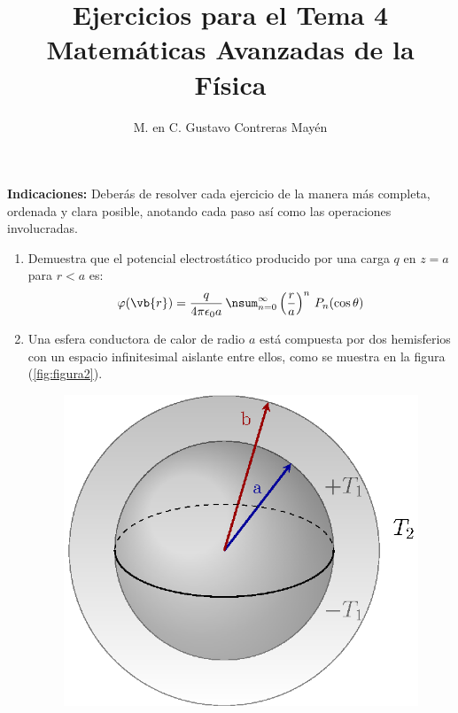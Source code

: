 
\title{Ejercicios para el Tema 4 \\[0.3em]  \large{Matemáticas Avanzadas de la Física}\vspace{-3ex}}
\author{M. en C. Gustavo Contreras Mayén}
\date{ }

\vspace{-4cm}
\maketitle
\fontsize{14}{14}\selectfont

\textbf{Indicaciones: } Deberás de resolver cada ejercicio de la manera más completa, ordenada y clara posible, anotando cada paso así como las operaciones involucradas.

\begin{enumerate}
\item Demuestra que el potencial electrostático producido por una carga $q$ en $z = a$ para $r < a$ es:
\begin{align*}
\varphi(\vb{r}) = \dfrac{q}{4 \pi \epsilon_{0} a} \, \nsum_{n=0}^{\infty} \left( \dfrac{r}{a} \right)^{n} \, P_{n}(\cos \theta)
\end{align*}
\item Una esfera conductora de calor de radio $a$ está compuesta por dos hemisferios con un espacio infinitesimal aislante entre ellos, como se muestra en la figura (\ref{fig:figura2}).
\begin{figure}[H]
    \centering
   \includegraphics[scale=0.9]{Imagenes/esfera1.eps}

\end{figure}
\end{enumerate}
